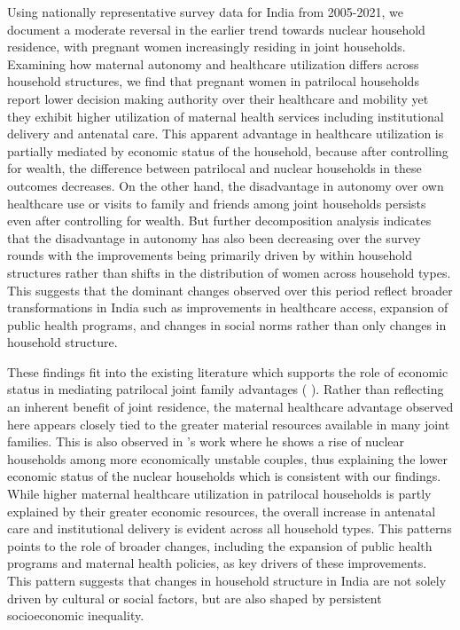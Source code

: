 \documentclass[12pt]{article}
\begin{document}
Using nationally representative survey data for India from 2005-2021, we document a moderate reversal in the earlier trend towards nuclear household residence, with pregnant women increasingly residing in joint households.  Examining how maternal autonomy and healthcare utilization differs across household structures, we find that pregnant women in patrilocal households report lower decision making authority over their healthcare and mobility yet they exhibit higher utilization of maternal health services including institutional delivery and antenatal care. This apparent advantage in healthcare utilization is partially mediated by economic status of the household, because after controlling for wealth, the difference between patrilocal and nuclear households in these outcomes decreases. On the other hand, the disadvantage in autonomy over own healthcare use or visits to family and friends among joint households persists even after controlling for wealth.  But further decomposition analysis indicates that the disadvantage in autonomy has also been decreasing over the survey rounds with the improvements being primarily driven by within household structures rather than shifts in the distribution of women across household types. This suggests that the dominant changes observed over this period reflect broader transformations in India such as improvements in healthcare access, expansion of public health programs, and changes in social norms rather than only changes in household structure. 

These findings fit into the existing literature which supports the role of economic status in mediating patrilocal joint family advantages (\cite{allendorf2013going} \cite{breton2021modernisation}). Rather than reflecting an inherent benefit of joint residence, the maternal healthcare advantage observed here appears closely tied to the greater material resources available in many joint families. This is also observed in \cite{breton2021modernisation}'s work where he shows a rise of nuclear households among more economically unstable couples, thus explaining the lower economic status of the nuclear households which is consistent with our findings. While higher maternal healthcare utilization in patrilocal households is partly explained by their greater economic resources, the overall increase in antenatal care and institutional delivery is evident across all household types. This patterns points to the role of broader changes, including the expansion of public health programs and maternal health policies, as key drivers of these improvements. This pattern suggests that changes in household structure in India are not solely driven by cultural or social factors, but are also shaped by persistent socioeconomic inequality. 
\end{document}
